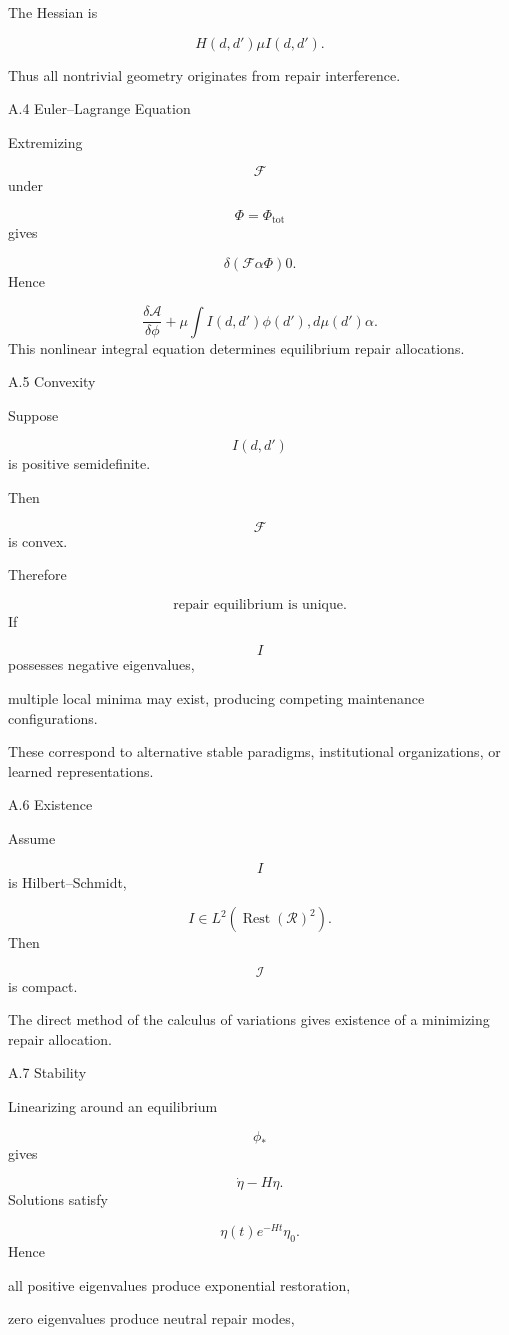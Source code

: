 \documentclass[12pt,oneside]{article}
\theoremstyle{plain}
\theoremstyle{definition}
\theoremstyle{remark}
\DeclareMathOperator{\Rest}{Rest}
\begin{document}
The Hessian is

\[
H(d,d')
\mu I(d,d').
\]

Thus all nontrivial geometry originates from repair interference.


A.4 Euler–Lagrange Equation

Extremizing

\[
\mathcal F
\]
under

\[
\Phi=\Phi_{\mathrm{tot}}
\]
gives

\[
\delta
\left(
\mathcal F
\alpha\Phi
\right)
0. 
\]
Hence

\[
\frac{\delta\mathcal A}{\delta\phi}
+
\mu
\int
I(d,d')
\phi(d')
,d\mu(d')
\alpha.
\]
This nonlinear integral equation determines equilibrium repair allocations.


A.5 Convexity

Suppose

\[
I(d,d')
\]
is positive semidefinite.

Then

\[
\mathcal F
\]
is convex.

Therefore

\[
\boxed{
\text{repair equilibrium is unique.}
}
\]
If

\[
I
\]
possesses negative eigenvalues,

multiple local minima may exist, producing competing maintenance configurations.

These correspond to alternative stable paradigms, institutional organizations, or learned representations.


A.6 Existence

Assume

\[
I
\]
is Hilbert–Schmidt,

\[
I\in
L^2
(\Rest(\mathcal R)^2).
\]
Then

\[
\mathcal I
\]
is compact.

The direct method of the calculus of variations gives existence of a minimizing repair allocation.


A.7 Stability

Linearizing around an equilibrium

\[
\phi_*
\]
gives

\[
\dot\eta
- 
H\eta.
\]
Solutions satisfy

\[
\eta(t)
e^{-Ht}\eta_0.
\]
Hence

all positive eigenvalues produce exponential restoration,

zero eigenvalues produce neutral repair modes,
\end{document}
